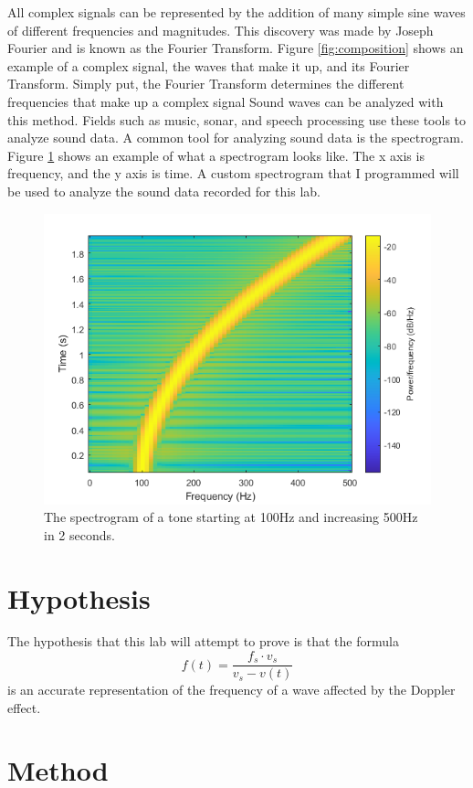\documentclass[12pt]{article}
\begin{document}
All complex signals can be represented by the addition of many simple sine waves of different frequencies and magnitudes. This discovery was made by Joseph Fourier and is known as the Fourier Transform. Figure \ref{fig:composition}
shows an example of a complex signal, the waves that make it up, and its Fourier Transform. Simply put, the Fourier Transform determines the different frequencies that make up a complex signal
Sound waves can be analyzed with this method. Fields such as music, sonar, and speech
processing use these tools to analyze sound data. A common tool for analyzing sound
data is the spectrogram. Figure \ref{fig:spectrogram} shows an example of what a spectrogram looks like. The x axis is frequency, and the y axis is time. 
A custom spectrogram that I programmed will be used to analyze the sound data recorded for this lab.

\begin{figure}[H]
	\centering
	\includegraphics[width=5in]{spectrogram}
	\caption{The spectrogram of a tone starting at 100Hz and increasing 500Hz in 2 seconds. }
	\label{fig:spectrogram}
\end{figure}


\section{Hypothesis}
The hypothesis that this lab will attempt to prove is that the formula 
$$ f(t) = \frac{f_s \cdot v_s}{ v_s - v(t) }$$ 
is an accurate representation of the frequency of a wave affected by the Doppler effect. 

\section{Method}
\end{document}
